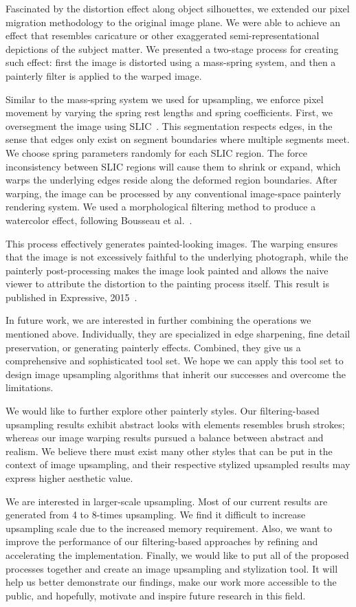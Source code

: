 Fascinated by the distortion effect along object silhouettes, we extended our pixel migration methodology to the original image plane. We were able to achieve an effect that resembles caricature or other exaggerated semi-representational depictions of the subject matter. We presented a two-stage process for creating such effect: first the image is distorted using a mass-spring system, and then a painterly filter is applied to the warped image.

Similar to the mass-spring system we used for upsampling, we enforce pixel movement by varying the spring rest lengths and spring coefficients. First, we oversegment the image using SLIC~\cite{SLIC}. This segmentation respects edges, in the sense that edges only exist on segment boundaries where multiple segments meet. We choose spring parameters randomly for each SLIC region. The force inconsistency between SLIC regions will cause them to shrink or expand, which warps the underlying edges reside along the deformed region boundaries. After warping, the image can be processed by any conventional image-space painterly rendering system. We used a morphological filtering method to produce a watercolor effect, following Bousseau et al.~\cite{Bousseau:2007}. 

This process effectively generates painted-looking images. The warping ensures that the image is not excessively faithful to the underlying photograph, while the painterly post-processing makes the image look painted and allows the naive viewer to attribute the distortion to the painting process itself. This result is published in Expressive, 2015~\cite{li}.

In future work, we are interested in further combining the operations we mentioned above. Individually, they are specialized in edge sharpening, fine detail preservation, or generating painterly effects. Combined, they give us a comprehensive and sophisticated tool set. We hope we can apply this tool set to design image upsampling algorithms that inherit our successes and overcome the limitations. 

We would like to further explore other painterly styles. Our filtering-based upsampling results exhibit abstract looks with elements resembles brush strokes; whereas our image warping results pursued a balance between abstract and realism. We believe there must exist many other styles that can be put in the context of image upsampling, and their respective stylized upsampled results may express higher aesthetic value.

We are interested in larger-scale upsampling. Most of our current results are generated from 4 to 8-times upsampling. We find it difficult to increase upsampling scale due to the increased memory requirement. Also, we want to improve the performance of our filtering-based approaches by refining and accelerating the implementation. Finally, we would like to put all of the proposed processes together and create an image upsampling and stylization tool. It will help us better demonstrate our findings, make our work more accessible to the public, and hopefully, motivate and inspire future research in this field.

